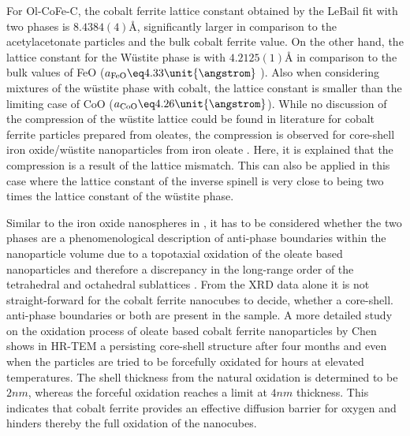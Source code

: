 \documentclass[\main/dresen_thesis.tex]{subfiles}
\begin{document}
    For Ol-CoFe-C, the cobalt ferrite lattice constant obtained by the LeBail fit with two phases is $8.4384(4) \unit{\angstrom}$, significantly larger in comparison to the acetylacetonate particles and the bulk cobalt ferrite value.
    On the other hand, the lattice constant for the W\"ustite phase is with $4.2125(1) \unit{\angstrom}$ in comparison to the bulk values of FeO ($a_\mathrm{FeO} \eq 4.33 \unit{\angstrom}$ \cite{Hentschel_1970_Stoich}).
    Also when considering mixtures of the w\"ustite phase with cobalt, the lattice constant is smaller than the limiting case of CoO ($a_\mathrm{CoO} \eq 4.26 \unit{\angstrom}$).
    While no discussion of the compression of the w\"ustite lattice could be found in literature for cobalt ferrite particles prepared from oleates, the compression is observed for core-shell iron oxide/w\"ustite nanoparticles from iron oleate \cite{Wetterskog_2013_Anoma}.
    Here, it is explained that the compression is a result of the lattice mismatch.
    This can also be applied in this case where the lattice constant of the inverse spinell is very close to being two times the lattice constant of the w\"ustite phase.

    Similar to the iron oxide nanospheres in , it has to be considered whether the two phases are a phenomenological description of anti-phase boundaries within the nanoparticle volume due to a topotaxial oxidation of the oleate based nanoparticles and therefore a discrepancy in the long-range order of the tetrahedral and octahedral sublattices \cite{Wetterskog_2013_Anoma}.
    From the XRD data alone it is not straight-forward for the cobalt ferrite nanocubes to decide, whether a core-shell. anti-phase boundaries or both are present in the sample.
    A more detailed study on the oxidation process of oleate based cobalt ferrite nanoparticles by Chen \etal \cite{Chen_2010_Chara} shows in HR-TEM a persisting core-shell structure after four months and even when the particles are tried to be forcefully oxidated for hours at elevated temperatures.
    The shell thickness from the natural oxidation is determined to be $2 \unit{nm}$, whereas the forceful oxidation reaches a limit at $4 \unit{nm}$ thickness.
    This indicates that cobalt ferrite provides an effective diffusion barrier for oxygen and hinders thereby the full oxidation of the nanocubes.
\end{document}
